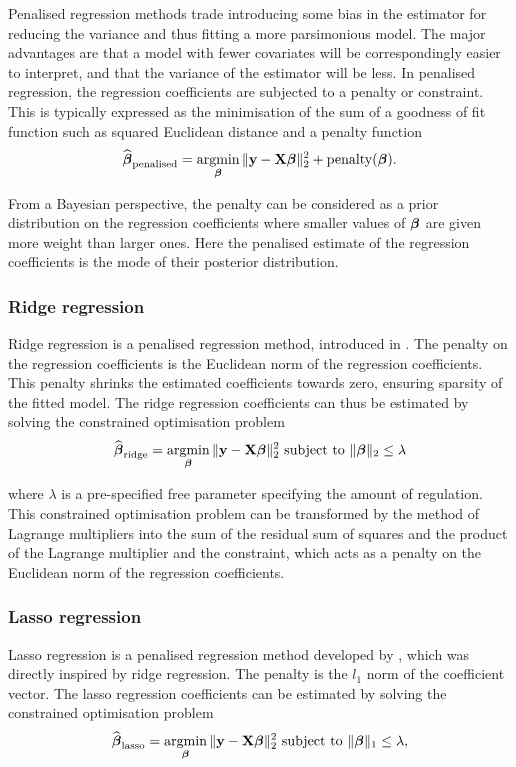 Penalised regression methods trade introducing some bias in the estimator for
reducing the variance and thus fitting a more parsimonious model. The major
advantages are that a model with fewer covariates will be correspondingly easier
to interpret, and that the variance of the estimator will be less. In penalised
regression, the regression coefficients are subjected to a penalty or
constraint. This is typically expressed as the minimisation of the sum of a
goodness of fit function such as squared Euclidean distance and a penalty
function
$$
\widehat{\vbeta}_{\text{penalised}} = \argmin_\vbeta \|\vy - \mX \vbeta\|_2^2 + \text{penalty}(\vbeta).
$$

From a Bayesian perspective, the penalty can be considered as a prior
distribution on the regression coefficients where smaller values of ${\boldsymbol \beta}$ are
given more weight than larger ones. Here the penalised estimate of the
regression coefficients is the mode of their posterior distribution.

\subsubsection{Ridge regression}

Ridge regression is a penalised regression method, introduced in
\cite{Hoerl1970}. The penalty on the regression coefficients is the Euclidean
norm of the regression coefficients. This penalty shrinks the estimated
coefficients towards zero, ensuring sparsity of the fitted model. The ridge
regression coefficients can thus be estimated by solving the constrained
optimisation problem
$$
\widehat{\vbeta}_{\text{ridge}} = \argmin_\vbeta \|\vy - \mX \vbeta\|_2^2 \text{ subject to } \|\vbeta\|_2 \leq \lambda
$$

where $\lambda$ is a pre-specified free parameter specifying the amount of
regulation. This constrained optimisation problem can be transformed by the
method of Lagrange multipliers into the sum of the residual sum of squares and
the product of the Lagrange multiplier and the constraint, which acts as a
penalty on the Euclidean norm of the regression coefficients.


\subsubsection{Lasso regression}

Lasso regression is a penalised regression method developed by
\citep{Tibshirani1996}, which was directly inspired by ridge regression.  The
penalty is the $l_1$ norm of the coefficient vector.  The lasso regression
coefficients can be estimated by solving the constrained optimisation problem
$$
\widehat{\vbeta}_{\text{lasso}} = \argmin_\vbeta \|\vy - \mX \vbeta\|_2^2 \text{ subject to } \|\vbeta\|_1 \leq \lambda,
$$

